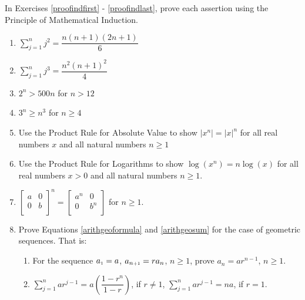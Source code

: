 \documentclass{ximera}
\begin{document}
	\author{Stitz-Zeager}


In Exercises \ref{proofindfirst} - \ref{proofindlast}, prove each assertion using the Principle of Mathematical Induction.

\begin{enumerate}

\item  $\displaystyle{ \sum_{j=1}^{n} j^2 = \dfrac{n(n+1)(2n+1)}{6}}$ \label{proofindfirst}

\item  $\displaystyle{ \sum_{j=1}^{n} j^3 = \dfrac{n^2(n+1)^2}{4}}$

\item  $2^{n} > 500 n$ for $n > 12$

\item  $3^{n} \geq n^3$ for $n \geq 4$

\item  Use the Product Rule for Absolute Value to show  $\left|x^{n}\right| = |x|^{n}$ for all real numbers $x$ and all natural numbers $n \geq 1$

\item  Use the Product Rule for Logarithms to show $\log\left(x^{n}\right) = n \log(x)$ for all real numbers $x > 0$ and all natural numbers $n \geq 1$.

\item  $\left[ \begin{array}{cc} a & 0 \\ 0 & b \\ \end{array} \right]^{n} = \left[ \begin{array}{cc} a^{n} & 0 \\ 0 & b^{n} \\ \end{array} \right]$ for $n \geq 1$. \label{proofindlast}


\item  Prove Equations \ref{arithgeoformula} and \ref{arithgeosum} for the case of geometric sequences.  That is:

\begin{enumerate}

\item \label{proofgeosequeneex} For the sequence  $a_{\mbox{\tiny $1$}} = a$, $a_{n\mbox{\tiny{$+1$}}} = r a_{n}$, $n \geq 1$, prove $a_{n} = ar^{n-1}$, $n \geq 1$.

\item  \label{proofgeosumex} $\displaystyle{\sum_{j=1}^{n} a r^{j-1} = a \left( \dfrac{1-r^n}{1-r}\right)}$, if $r \neq 1$, $\displaystyle{\sum_{j=1}^{n} a r^{j-1} = na}$, if $r=1$.


\end{enumerate}
\end{enumerate}
\end{document}
